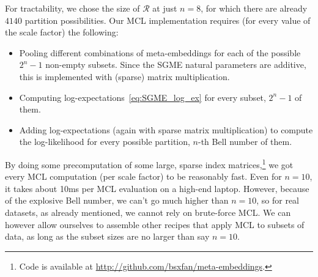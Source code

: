 \documentclass[a4paper,oneside,12pt,english]{report}
\def\Rset{\mathcal{R}}
\begin{document}
For tractability, we chose the size of $\Rset$ at just $n=8$, for which there are already $4140$ partition possibilities. Our MCL implementation requires (for every value of the scale factor) the following: 
\begin{itemize}
	\item Pooling different combinations of meta-embeddings for each of the possible $2^{n}-1$ non-empty subsets. Since the SGME natural parameters are additive, this is implemented with (sparse) matrix multiplication. 
	\item Computing log-expectations~\eqref{eq:SGME_log_ex} for every subset, $2^{n}-1$ of them.
	\item Adding log-expectations (again with sparse matrix multiplication) to compute the log-likelihood for every possible partition, $n$-th Bell number of them. 
\end{itemize}
By doing some precomputation of some large, sparse index matrices,\footnote{Code is available at \url{http://github.com/bsxfan/meta-embeddings}.} we got every MCL computation (per scale factor) to be reasonably fast. Even for $n=10$, it takes about 10ms per MCL evaluation on a high-end laptop. However, because of the explosive Bell number, we can't go much higher than $n=10$, so for real datasets, as already mentioned, we cannot rely on brute-force MCL. We can however allow ourselves to assemble other recipes that apply MCL to subsets of data, as long as the subset sizes are no larger than say $n=10$.  
\end{document}
